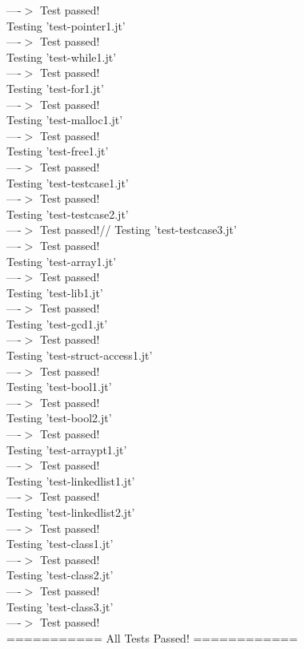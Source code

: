 \documentclass{article}
\begin{document}
  ----$>$  Test passed!\\
Testing 'test-pointer1.jt'\\
  ----$>$  Test passed!\\
Testing 'test-while1.jt'\\
  ----$>$  Test passed!\\
Testing 'test-for1.jt'\\
  ----$>$  Test passed!\\
Testing 'test-malloc1.jt'\\
  ----$>$  Test passed!\\
Testing 'test-free1.jt'\\
  ----$>$  Test passed!\\
Testing 'test-testcase1.jt'\\
  ----$>$  Test passed!\\
Testing 'test-testcase2.jt'\\
  ----$>$  Test passed!//
Testing 'test-testcase3.jt'\\
  ----$>$  Test passed!\\
Testing 'test-array1.jt'\\
  ----$>$  Test passed!\\
Testing 'test-lib1.jt'\\
  ----$>$  Test passed!\\
Testing 'test-gcd1.jt'\\
  ----$>$  Test passed!\\
Testing 'test-struct-access1.jt'\\
  ----$>$  Test passed!\\
Testing 'test-bool1.jt'\\
  ----$>$  Test passed!\\
Testing 'test-bool2.jt'\\
  ----$>$  Test passed!\\
Testing 'test-arraypt1.jt'\\
  ----$>$  Test passed!\\
  Testing 'test-linkedlist1.jt'\\
  ----$>$  Test passed!\\
Testing 'test-linkedlist2.jt'\\
  ----$>$  Test passed!\\
Testing 'test-class1.jt'\\
  ----$>$  Test passed!\\
Testing 'test-class2.jt'\\
  ----$>$  Test passed!\\
Testing 'test-class3.jt'\\
  ----$>$  Test passed!\\
=========== All Tests Passed! ============\\
\end{document}
